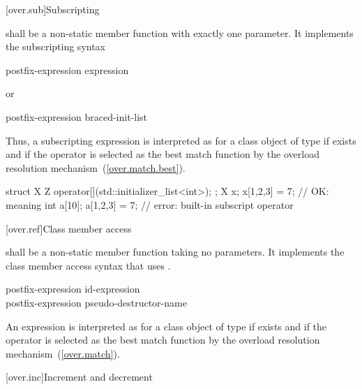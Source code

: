 [over.sub]{Subscripting}%
%

\pnum
{}
shall be a non-static member function with exactly one parameter.
It implements the subscripting syntax

\begin{ncsimplebnf}
postfix-expression \terminal{[} expression \terminal{]}
\end{ncsimplebnf}

or

\begin{ncsimplebnf}
postfix-expression \terminal{[} braced-init-list \terminal{]}
\end{ncsimplebnf}

Thus, a subscripting expression
is interpreted as
for a class object
of type
if
exists and if the operator is selected as the best match function by
the overload resolution mechanism~(\ref{over.match.best}).
\enterexample
\begin{codeblock}
struct X {
  Z operator[](std::initializer_list<int>);
};
X x;
x[{1,2,3}] = 7;           // OK: meaning 
int a[10];
a[{1,2,3}] = 7;           // error: built-in subscript operator
\end{codeblock}
\exitexample

[over.ref]{Class member access}
%

\pnum
{}
shall be a non-static member function taking no parameters.
It implements the class member access syntax that
uses \tcode{->}.

\begin{ncsimplebnf}
postfix-expression \terminal{->}  id-expression\\
postfix-expression \terminal{->} pseudo-destructor-name
\end{ncsimplebnf}

An expression
is interpreted as
for a class object
of type
if
exists and if the operator is selected as the best match function by
the overload resolution mechanism~(\ref{over.match}).

[over.inc]{Increment and decrement}
%
%
%
%


